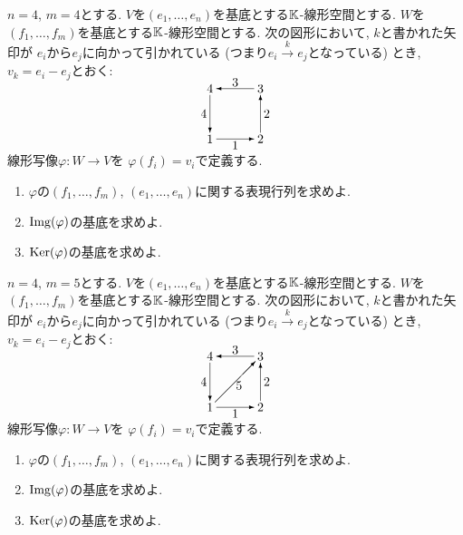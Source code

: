 \begin{quiz}
  $n=4$,
  $m=4$とする.
  $V$を$(e_1,\ldots,e_n)$を基底とする$\mathbb{K}$-線形空間とする.
  $W$を$(f_1,\ldots,f_m)$を基底とする$\mathbb{K}$-線形空間とする.
  次の図形において,
  $k$と書かれた矢印が
  $e_i$から$e_j$に向かって引かれている
  (つまり$e_i\xrightarrow{k} e_j$となっている)
  とき,
  $v_k=e_i-e_j$とおく:
  \begin{align*}
    \begin{picture}(40,40)
      \put(0,0){\makebox(0,0){1}}
      \put(40,0){\makebox(0,0){2}}
      \put(40,40){\makebox(0,0){3}}
      \put(0,40){\makebox(0,0){4}}
      \put(5,0){\vector(1,0){30}}
      \put(40,5){\vector(0,1){30}}
      \put(35,40){\vector(-1,0){30}}
      \put(0,35){\vector(0,-1){30}}
      \put(20,-5){\makebox(0,0){1}}
      \put(45,20){\makebox(0,0){2}}
      \put(20,45){\makebox(0,0){3}}
      \put(-5,20){\makebox(0,0){4}}
    \end{picture}
  \end{align*}
  線形写像$\varphi\colon W\to V$を
  $\varphi(f_i)=v_i$で定義する.
  \begin{enumerate}
  \item $\varphi$の$(f_1,\ldots,f_m)$, $(e_1,\ldots,e_n)$に関する表現行列を求めよ.
  \item $\operatorname{Img}(\varphi)$の基底を求めよ.
  \item $\operatorname{Ker}(\varphi)$の基底を求めよ.
  \end{enumerate}
\end{quiz}

\begin{quiz}
  $n=4$,
  $m=5$とする.
  $V$を$(e_1,\ldots,e_n)$を基底とする$\mathbb{K}$-線形空間とする.
  $W$を$(f_1,\ldots,f_m)$を基底とする$\mathbb{K}$-線形空間とする.
  次の図形において,
  $k$と書かれた矢印が
  $e_i$から$e_j$に向かって引かれている
  (つまり$e_i\xrightarrow{k} e_j$となっている)
  とき,
  $v_k=e_i-e_j$とおく:
  \begin{align*}
    \begin{picture}(40,40)
      \put(0,0){\makebox(0,0){1}}
      \put(40,0){\makebox(0,0){2}}
      \put(40,40){\makebox(0,0){3}}
      \put(0,40){\makebox(0,0){4}}
      \put(5,0){\vector(1,0){30}}
      \put(40,5){\vector(0,1){30}}
      \put(35,40){\vector(-1,0){30}}
      \put(0,35){\vector(0,-1){30}}
      \put(4,4){\vector(1,1){32}}
      \put(20,-5){\makebox(0,0){1}}
      \put(45,20){\makebox(0,0){2}}
      \put(20,45){\makebox(0,0){3}}
      \put(-5,20){\makebox(0,0){4}}
      \put(23,17){\makebox(0,0){5}}
    \end{picture}
  \end{align*}
  線形写像$\varphi\colon W\to V$を
  $\varphi(f_i)=v_i$で定義する.
  \begin{enumerate}
  \item $\varphi$の$(f_1,\ldots,f_m)$, $(e_1,\ldots,e_n)$に関する表現行列を求めよ.
  \item $\operatorname{Img}(\varphi)$の基底を求めよ.
  \item $\operatorname{Ker}(\varphi)$の基底を求めよ.
  \end{enumerate}
\end{quiz}

